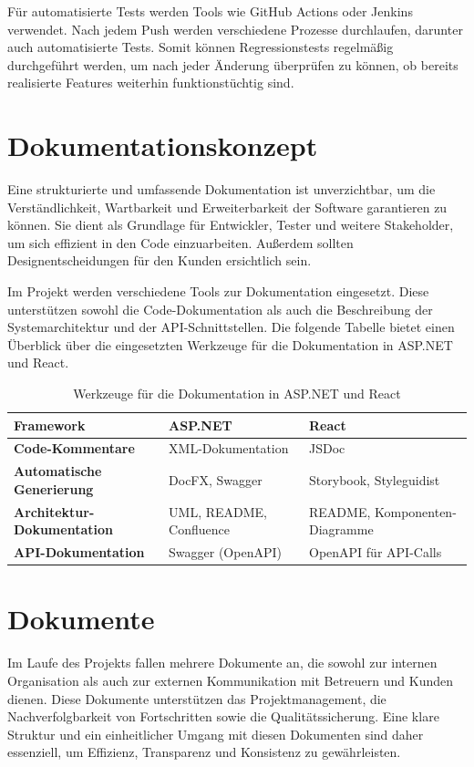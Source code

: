 \documentclass[a4paper,12pt]{article}
\begin{document}
Für automatisierte Tests werden Tools wie GitHub Actions oder Jenkins verwendet. Nach jedem Push werden verschiedene Prozesse durchlaufen, darunter auch automatisierte Tests. Somit können Regressionstests regelmäßig durchgeführt werden, um nach jeder Änderung überprüfen zu können, ob bereits realisierte Features weiterhin funktionstüchtig sind.

\newpage
\section{Dokumentationskonzept}

Eine strukturierte und umfassende Dokumentation ist unverzichtbar, um die Verständlichkeit, Wartbarkeit und Erweiterbarkeit der Software garantieren zu können. Sie dient als Grundlage für Entwickler, Tester und weitere Stakeholder, um sich effizient in den Code einzuarbeiten. Außerdem sollten Designentscheidungen für den Kunden ersichtlich sein.

Im Projekt werden verschiedene Tools zur Dokumentation eingesetzt. Diese unterstützen sowohl die Code-Dokumentation als auch die Beschreibung der Systemarchitektur und der API-Schnittstellen. Die folgende Tabelle bietet einen Überblick über die eingesetzten Werkzeuge für die Dokumentation in \mbox{ASP.NET} und React.

\begin{table}[h]
    \centering
    \begin{tabular}{|p{4.5cm}|p{4.5cm}|p{4.5cm}|}
        \hline
        \textbf{Framework}                 & \textbf{ASP.NET}        & \textbf{React}                \\ \hline
        \textbf{Code-Kommentare}           & XML-Dokumentation       & JSDoc                         \\ \hline
        \textbf{Automatische Generierung}  & DocFX, Swagger          & Storybook, Styleguidist       \\ \hline
        \textbf{Architektur-Dokumentation} & UML, README, Confluence & README, Komponenten-Diagramme \\ \hline
        \textbf{API-Dokumentation}         & Swagger (OpenAPI)       & OpenAPI für API-Calls         \\ \hline
    \end{tabular}
    \caption{Werkzeuge für die Dokumentation in ASP.NET und React}
    \label{tab:werkzeuge_dokumentation}
\end{table}

\newpage
\section{Dokumente}
Im Laufe des Projekts fallen mehrere Dokumente an, die sowohl zur internen Organisation als auch zur externen Kommunikation mit Betreuern und Kunden dienen. Diese Dokumente unterstützen das Projektmanagement, die Nachverfolgbarkeit von Fortschritten sowie die Qualitätssicherung. Eine klare Struktur und ein einheitlicher Umgang mit diesen Dokumenten sind daher essenziell, um Effizienz, Transparenz und Konsistenz zu gewährleisten.
\end{document}
